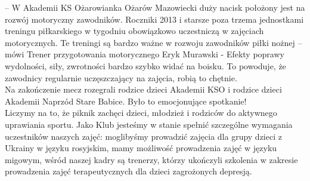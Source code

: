 \documentclass[14pt, letterpaper, titlepage]{article}
\begin{document}
– W Akademii KS Ożarowianka Ożarów Mazowiecki duży nacisk położony jest na rozwój motoryczny zawodników. Roczniki 2013 i starsze poza trzema jednostkami treningu piłkarskiego w tygodniu obowiązkowo uczestniczą w zajęciach motorycznych. Te treningi są bardzo ważne w rozwoju zawodników piłki nożnej – mówi Trener przygotowania motorycznego Eryk Murawski - Efekty poprawy wydolności, siły, zwrotności bardzo szybko widać na boisku. To powoduje, że zawodnicy regularnie uczęszczający na zajęcia, robią to chętnie.\\

Na zakończenie mecz rozegrali rodzice dzieci Akademii KSO i rodzice dzieci Akademii Naprzód Stare Babice. Było to emocjonujące spotkanie! \\

Liczymy na to, że piknik zachęci dzieci, młodzież i rodziców do aktywnego uprawiania sportu. Jako Klub jesteśmy w stanie spełnić szczególne wymagania uczestników naszych zajęć: moglibyśmy prowadzić zajęcia dla grupy dzieci z Ukrainy w języku rosyjskim, mamy możliwość prowadzenia zajęć w języku migowym, wśród naszej kadry są trenerzy, którzy ukończyli szkolenia w zakresie prowadzenia zajęć terapeutycznych dla dzieci zagrożonych depresją.\\
\end{document}
